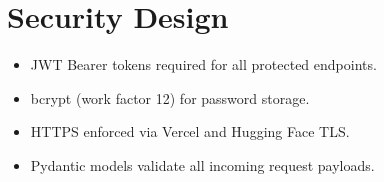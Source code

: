 \section{Security Design}
\begin{itemize}
    \item JWT Bearer tokens required for all protected endpoints.
    \item bcrypt (work factor 12) for password storage.
    \item HTTPS enforced via Vercel and Hugging Face TLS.
    \item Pydantic models validate all incoming request payloads.
\end{itemize}
